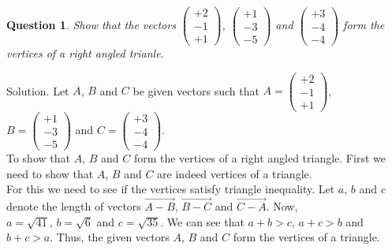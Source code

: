 \documentclass{article}
\newtheorem{question}[theorem]{Question}
\begin{document}
\begin{question}
	Show that the vectors $\begin{pmatrix} 
		 +2\\-1\\+1 
	\end{pmatrix}$, $\begin{pmatrix} 
	 +1\\-3\\-5 
\end{pmatrix}$ and $\begin{pmatrix} 
+3\\-4\\-4 
\end{pmatrix}$ form the vertices of a right angled trianle.
\end{question}
Solution. Let $A$, $B$ and $C$ be given vectors such that $A =\begin{pmatrix} 
	+2\\-1\\+1 
\end{pmatrix}$,\\     
$B= \begin{pmatrix} 
+1\\-3\\-5 
\end{pmatrix}$ and $C= \begin{pmatrix} 
+3\\-4\\-4 
\end{pmatrix}$.\\
To show that $A$, $B$ and $C$ form the vertices of a right angled triangle. First we need to show that $A$, $B$ and $C$ are indeed vertices of a triangle.\\
For this we need to see if the vertices satisfy triangle inequality. Let $a$, $b$ and $c$ denote the length of vectors $\overrightarrow{A-B}$, $\overrightarrow{B-C}$ and $\overrightarrow{C-A}$. Now,\\
$a=\sqrt{41}$, $b=\sqrt{6}$ and $c=\sqrt{35}$. We can see that  $a+b>c$, 
$a+c>b$ and $b+c >a$. Thus, the given vectors $A$, $B$ and $C$ form the vertices of a triangle.\\


 \begin{figure}[!htb]
	\caption{\label{fig1}}
\end{figure}
\end{document}
